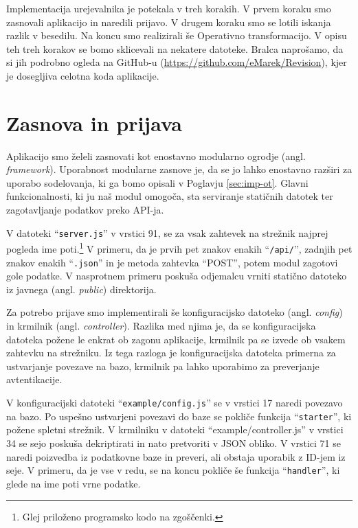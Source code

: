 \documentclass[a4paper, 12pt, twoside]{book}
\begin{document}
Implementacija urejevalnika je potekala v treh korakih. V prvem koraku smo zasnovali aplikacijo in naredili prijavo. V drugem koraku smo se lotili iskanja razlik v besedilu. Na koncu smo realizirali še Operativno transformacijo. V opisu teh treh korakov se bomo sklicevali na nekatere datoteke. Bralca naprošamo, da si jih podrobno ogleda na GitHub-u (\url{https://github.com/eMarek/Revision}), kjer je dosegljiva celotna koda aplikacije.

\section{Zasnova in prijava}

Aplikacijo smo želeli zasnovati kot enostavno modularno ogrodje (angl. \textit{framework}). Uporabnost modularne zasnove je, da se jo lahko enostavno razširi za uporabo sodelovanja, ki ga bomo opisali v Poglavju \ref{sec:imp-ot}. Glavni funkcionalnosti, ki ju naš modul omogoča, sta serviranje statičnih datotek ter zagotavljanje podatkov preko API-ja.

V datoteki “{\tt server.js}” v vrstici 91, se za vsak zahtevek na strežnik najprej pogleda ime poti.\footnote{Glej priloženo programsko kodo na zgoščenki.} V primeru, da je prvih pet znakov enakih “{\tt /api/}”, zadnjih pet znakov enakih “{\tt .json}” in je metoda zahtevka “POST”, potem modul zagotovi gole podatke. V nasprotnem primeru poskuša odjemalcu vrniti statično datoteko iz javnega (angl. \textit{public}) direktorija.

Za potrebo prijave smo implementirali še konfiguracijsko datoteko (angl. \textit{config}) in krmilnik (angl. \textit{controller}). Razlika med njima je, da se konfiguracijska datoteka požene le enkrat ob zagonu aplikacije, krmilnik pa se izvede ob vsakem zahtevku na strežniku. Iz tega razloga je konfiguracijska datoteka primerna za ustvarjanje povezave na bazo, krmilnik pa lahko uporabimo za preverjanje avtentikacije.

V konfiguracijski datoteki “{\tt example/config.js}” se v vrstici 17 naredi povezavo na bazo. Po uspešno ustvarjeni povezavi do baze se pokliče funkcija “{\tt starter}”, ki požene spletni strežnik. V krmilniku v datoteki “{example/controller.js}” v vrstici 34 se sejo poskuša dekriptirati in nato pretvoriti v JSON obliko. V vrstici 71 se naredi poizvedba iz podatkovne baze in preveri, ali obstaja uporabik z ID-jem iz seje. V primeru, da je vse v redu, se na koncu pokliče še funkcija “{\tt handler}”, ki glede na ime poti vrne podatke.
\end{document}
